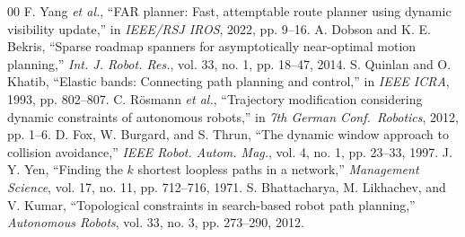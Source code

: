 \documentclass[conference]{IEEEtran}
\begin{document}
\begin{thebibliography}{00}
 F. Yang \emph{et al.}, ``FAR planner: Fast, attemptable route planner using dynamic visibility update,'' in \textit{IEEE/RSJ IROS}, 2022, pp. 9--16.
 A. Dobson and K. E. Bekris, ``Sparse roadmap spanners for asymptotically near-optimal motion planning,'' \textit{Int. J. Robot. Res.}, vol. 33, no. 1, pp. 18--47, 2014.
 S. Quinlan and O. Khatib, ``Elastic bands: Connecting path planning and control,'' in \textit{IEEE ICRA}, 1993, pp. 802--807.
 C. R\"osmann \emph{et al.}, ``Trajectory modification considering dynamic constraints of autonomous robots,'' in \textit{7th German Conf.\ Robotics}, 2012, pp. 1--6.
 D. Fox, W. Burgard, and S. Thrun, ``The dynamic window approach to collision avoidance,'' \textit{IEEE Robot. Autom. Mag.}, vol. 4, no. 1, pp. 23--33, 1997.
 J. Y. Yen, ``Finding the $k$ shortest loopless paths in a network,'' \textit{Management Science}, vol. 17, no. 11, pp. 712--716, 1971.
 S. Bhattacharya, M. Likhachev, and V. Kumar, ``Topological constraints in search-based robot path planning,'' \textit{Autonomous Robots}, vol. 33, no. 3, pp. 273--290, 2012.
\end{thebibliography}
\end{document}
